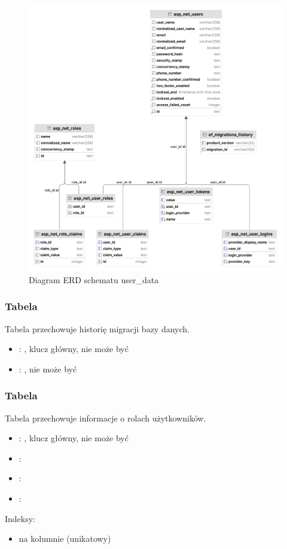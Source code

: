 \begin{figure}[H]
\centering
\includegraphics[width=1\textwidth]{attachments/user_data}
\caption{Diagram ERD schematu user\_data}
\label{fig:figure}
\end{figure}

\subsubsection{Tabela }
Tabela przechowuje historię migracji bazy danych.
\begin{itemize}
    \item {}: , klucz główny, nie może być 
    \item {}: , nie może być 
\end{itemize}

\subsubsection{Tabela }
Tabela przechowuje informacje o rolach użytkowników.
\begin{itemize}
    \item {}: , klucz główny, nie może być 
    \item {}: 
    \item {}: 
    \item {}: 
\end{itemize}
Indeksy:
\begin{itemize}
    \item {} na kolumnie  (unikatowy)
\end{itemize}

